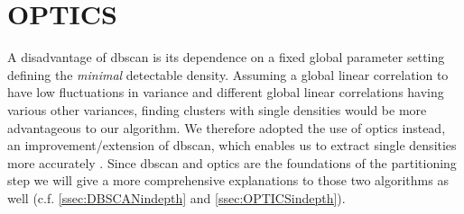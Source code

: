 \section{OPTICS}\label{sec:OPTICSintro}
A disadvantage of \gls{dbscan} is its dependence on a fixed global parameter setting defining the \textit{minimal} detectable density. Assuming a global linear correlation to have low fluctuations in variance and different global linear correlations having various other variances, finding clusters with single densities would be more advantageous to our algorithm. We therefore adopted the use of \gls{optics} instead, an improvement/extension of \gls{dbscan}, which enables us to extract single densities more accurately \cite{opticsankerst1999optics}. Since \gls{dbscan} and \gls{optics} are the foundations of the partitioning step we will give a more comprehensive explanations to those two algorithms as well (c.f. \autoref{ssec:DBSCANindepth} and \autoref{ssec:OPTICSindepth}).

    

